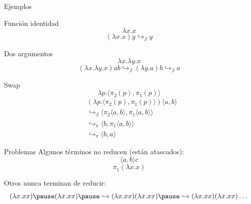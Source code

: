 \documentclass[aspectratio=149]{beamer}
\begin{document}
\begin{frame}{Ejemplos}
	\begin{exampleblock}{Función identidad}
		\[ \lambda x.x \]
		\[ (\lambda x.x) y \hookrightarrow_\beta y \]
	\end{exampleblock}
	
	\begin{exampleblock}{Dos argumentos}
		\[ \lambda x. \lambda y.x \]
		\[ (\lambda x. \lambda y.x) a b \hookrightarrow_\beta (\lambda y.a) b \hookrightarrow_\beta a \]
	\end{exampleblock}

	\begin{exampleblock}{Swap}
		\[ \lambda p. \langle \pi_2 (p), \pi_1 (p) \rangle \]
		\begin{align*}
			&(\lambda p. \langle \pi_2 (p), \pi_1 (p) \rangle) \langle a,b \rangle \\
			&\hookrightarrow_\beta \langle \pi_2 \langle a,b \rangle, \pi_1 \langle a,b \rangle \rangle \\
			&\hookrightarrow_\pi \langle b, \pi_1 \langle a,b \rangle \rangle \\
			&\hookrightarrow_\pi \langle b, a \rangle
		\end{align*}
	\end{exampleblock}
\end{frame}

\begin{frame}{Problemas}
	Algunos términos no reducen (están atascados):
	\[ \langle a, b \rangle c \]
	\[ \pi_1(\lambda x.x) \]
	
	\pause
	
	Otros nunca terminan de reducir:
	\[ (\lambda x.xx) \pause (\lambda x.xx) \pause
	\hookrightarrow (\lambda x.xx)(\lambda x.xx) \pause
	\hookrightarrow (\lambda x.xx)(\lambda x.xx) \dots \]
\end{frame}
\end{document}
